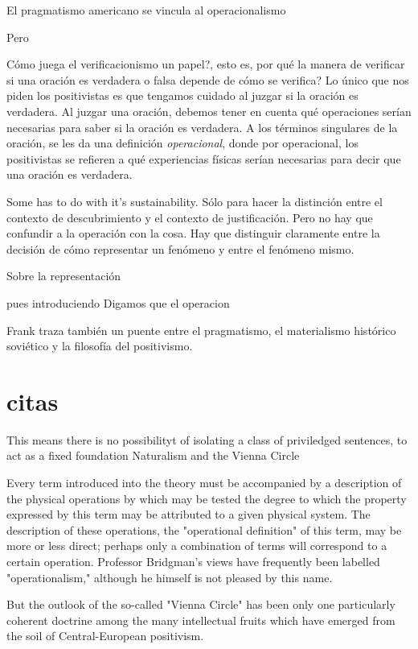 El pragmatismo americano se vincula al operacionalismo

Pero

Cómo juega el verificacionismo un papel?, esto es, por qué la manera de verificar si una oración es verdadera o falsa depende de cómo se verifica?
Lo único que nos piden los positivistas es que tengamos cuidado al juzgar si la oración es verdadera.
Al juzgar una oración, debemos tener en cuenta qué operaciones serían necesarias para saber si la oración es verdadera.
A los términos singulares de la oración, se les da una definición \emph{operacional}, donde por operacional, los positivistas se refieren a qué experiencias físicas serían necesarias para decir que una oración es verdadera.

Some has to do with it's sustainability.
Sólo para hacer la distinción entre el contexto de descubrimiento y el contexto de justificación.
Pero no hay que confundir a la operación con la cosa.
Hay que distinguir claramente entre la decisión de cómo representar un fenómeno y entre el fenómeno mismo.

Sobre la representación

pues introduciendo
Digamos que el operacion

Frank traza también un puente entre el pragmatismo, el materialismo histórico soviético y la filosofía del positivismo.


\section{citas}

This means there is no possibilityt of isolating a class of priviledged sentences, to act as a fixed foundation Naturalism and the Vienna Circle

Every term  introduced into the theory must be accompanied by  a description of the physical operations by which may  be tested the degree to which the property expressed  by this term may be attributed to a given physical  system. The description of these operations, the  "operational definition" of this term, may be more or  less direct; perhaps only a combination of terms will  correspond to a certain operation. Professor Bridgman's views have frequently been labelled "operationalism," although he himself is not pleased by this name.

But the outlook of the so-called "Vienna Circle"  has been only one particularly coherent doctrine  among the many intellectual fruits which have  emerged from the soil of Central-European positivism.

